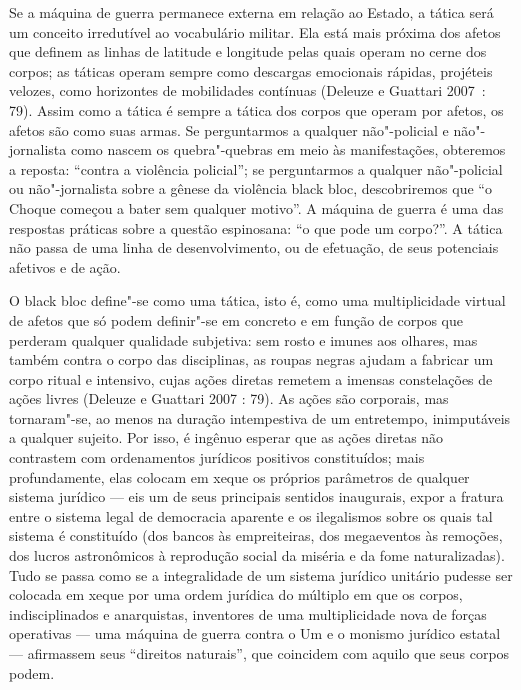 Se a máquina de guerra permanece externa em relação ao Estado, a tática
será um conceito irredutível ao vocabulário militar. Ela está mais
próxima dos afetos que definem as linhas de latitude e longitude pelas
quais operam no cerne dos corpos; as táticas operam sempre como
descargas emocionais rápidas, projéteis velozes, como horizontes de
mobilidades contínuas (Deleuze e Guattari 2007~: 79). Assim como a
tática é sempre a tática dos corpos que operam por afetos, os afetos são
como suas armas. Se perguntarmos a qualquer não"-policial e
não"-jornalista como nascem os quebra"-quebras em meio às manifestações,
obteremos a reposta: ``contra a violência policial''; se perguntarmos a
qualquer não"-policial ou não"-jornalista sobre a gênese da violência
black bloc, descobriremos que ``o Choque começou a bater sem qualquer
motivo''. A máquina de guerra é uma das respostas práticas sobre a
questão espinosana: ``o que pode um corpo?''. A tática não passa de uma
linha de desenvolvimento, ou de efetuação, de seus potenciais afetivos e
de ação.

O black bloc define"-se como uma tática, isto é, como uma multiplicidade
virtual de afetos que só podem definir"-se em concreto e em função de
corpos que perderam qualquer qualidade subjetiva: sem rosto e imunes aos
olhares, mas também contra o corpo das disciplinas, as roupas negras
ajudam a fabricar um corpo ritual e intensivo, cujas ações diretas
remetem a imensas constelações de ações livres (Deleuze e Guattari 2007
: 79). As ações são corporais, mas tornaram"-se, ao menos na duração
intempestiva de um entretempo, inimputáveis a qualquer sujeito. Por
isso, é ingênuo esperar que as ações diretas não contrastem com
ordenamentos jurídicos positivos constituídos; mais profundamente, elas
colocam em xeque os próprios parâmetros de qualquer sistema jurídico ---
eis um de seus principais sentidos inaugurais, expor a fratura entre o
sistema legal de democracia aparente e os ilegalismos sobre os quais tal
sistema é constituído (dos bancos às empreiteiras, dos megaeventos às
remoções, dos lucros astronômicos à reprodução social da miséria e da
fome naturalizadas). Tudo se passa como se a integralidade de um sistema
jurídico unitário pudesse ser colocada em xeque por uma ordem jurídica
do múltiplo em que os corpos, indisciplinados e anarquistas, inventores
de uma multiplicidade nova de forças operativas --- uma máquina de guerra
contra o Um e o monismo jurídico estatal --- afirmassem seus ``direitos
naturais'', que coincidem com aquilo que seus corpos podem.


